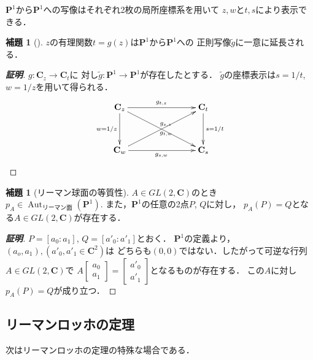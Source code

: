\documentclass[11pt, a4paper, dvipdfmx, draft]{jsarticle}
\theoremstyle{definition}
\newtheorem{Lemma}[Axiom]{補題}
\newcommand{\cc}{\mathbf{C}}
\newcommand{\pp}{\mathbf{P}}
\newcommand{\Aut}{\mathop{\mathrm{Aut}}\nolimits}
\theoremstyle{mystyle}
\numberwithin{equation}{section} %
\begin{document}
$\pp^1$から$\pp^1$への写像はそれぞれ2枚の局所座標系を用いて
$z,w$と$t,s$により表示できる．
\begin{Lemma}[{\cite[補題1.12]{ogs}}]\label{lem:contiP1}
    $z$の有理関数$t=g(z)$は$\pp^1$から$\pp^1$への
    正則写像$\widetilde{g}$に一意に延長される．
\end{Lemma}

\begin{proof}[\textbf{証明}]
    $g\colon\cc_z\to\cc_t$に
    対し$\widetilde{g}\colon\pp^1\to\pp^1$が存在したとする．
    $\widetilde{g}$の座標表示は$s=1/t$, $w=1/z$を用いて得られる．
    \begin{equation*}
        \vcenter{\xymatrix@C=36pt@R=36pt{
        \cc_z 
        \ar@{{}->}[d]_{w=1/z} 
        \ar@{{}->}[rr]^{g_{t,z}} 
        \ar@{{}->}[rrd]^{g_{s,z}} 
        && \cc_t
        \ar@{{}->}[d]^{s=1/t} 
        \\
        \cc_w 
        \ar[rr]_{g_{s,w}}
        \ar@{{}->}[rru]_{g_{t,w}} 
        && \cc_s \ar@{}[lu]
        }}
    \end{equation*}
    
\end{proof}

\begin{Lemma}[リーマン球面の等質性{\cite[補題1.13]{ogs}}]
    $A\in GL(2,\cc)$のとき
    $p_A \in \Aut_{\text{リーマン面}}(\pp^1)$. 
    また，$\pp^1$の任意の2点$P$, $Q$に対し，
    $p_A(P)=Q$となる$A\in GL(2,\cc)$が存在する．
\end{Lemma}

\begin{proof}[\textbf{証明}]
    $P=[a_0\colon a_1]$, $Q=[a'_0\colon a'_1]$とおく．
    $\pp^1$の定義より，$(a_o,a_1), (a'_0,a'_1\in\cc^2)$は
    どちらも$(0,0)$ではない．したがって可逆な行列$A\in GL(2,\cc)$で
    $A\begin{bmatrix}
        a_0\\a_1
    \end{bmatrix}=\begin{bmatrix}
        a'_0\\a'_1
    \end{bmatrix}$となるものが存在する．
    この$A$に対し$p_A(P)=Q$が成り立つ．
\end{proof}

\subsection{リーマンロッホの定理}

次はリーマンロッホの定理の特殊な場合である．
\end{document}
